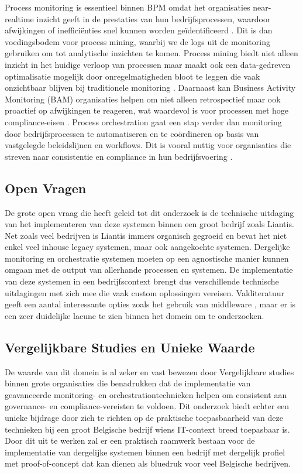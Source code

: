 Process monitoring is essentieel binnen BPM omdat het organisaties near-realtime inzicht geeft in de prestaties van hun bedrijfsprocessen, waardoor afwijkingen of inefficiënties snel kunnen worden geïdentificeerd \autocite{Janiesch2012}. Dit is dan voedingsbodem voor process mining, waarbij we de logs uit de monitoring gebruiken om tot analytische inzichten te komen. Process mining biedt niet alleen inzicht in het huidige verloop van processen maar maakt ook een data-gedreven optimalisatie mogelijk door onregelmatigheden bloot te leggen die vaak onzichtbaar blijven bij traditionele monitoring \autocite{Aalst2016}. Daarnaast kan Business Activity Monitoring (BAM) organisaties helpen om niet alleen retrospectief maar ook proactief op afwijkingen te reageren, wat waardevol is voor processen met hoge compliance-eisen \autocite{Janiesch2012}. Process orchestration gaat een stap verder dan monitoring door bedrijfsprocessen te automatiseren en te coördineren op basis van vastgelegde beleidslijnen en workflows. Dit is vooral nuttig voor organisaties die streven naar consistentie en compliance in hun bedrijfsvoering \autocite{Weske2019}. 

\subsection{Open Vragen}

De grote open vraag die heeft geleid tot dit onderzoek is de technische uitdaging van het implementeren van deze systemen binnen een groot bedrijf zoals Liantis. Net zoals veel bedrijven is Liantis immers organisch gegroeid en bevat het niet enkel veel inhouse legacy systemen, maar ook aangekochte systemen. Dergelijke monitoring en orchestratie systemen moeten op een agnostische manier kunnen omgaan met de output van allerhande processen en systemen. De implementatie van deze systemen in een bedrijfscontext brengt dus verschillende technische uitdagingen met zich mee die vaak custom oplossingen vereisen. Vakliteratuur geeft een aantal interessante opties zoals het gebruik van middleware \autocite{Weber2018}, maar er is een zeer duidelijke lacune te zien binnen het domein om te onderzoeken. 

\subsection{Vergelijkbare Studies en Unieke Waarde}

De waarde van dit domein is al zeker en vast bewezen door Vergelijkbare studies binnen grote organisaties \autocite{Harmon2014} die benadrukken dat de implementatie van geavanceerde monitoring- en orchestrationtechnieken helpen om consistent aan governance- en compliance-vereisten te voldoen. Dit onderzoek biedt echter een unieke bijdrage door zich te richten op de praktische toepasbaarheid van deze technieken bij een groot Belgische bedrijf wiens IT-context breed toepasbaar is. Door dit uit te werken zal er een praktisch raamwerk bestaan voor de implementatie van dergelijke systemen binnen een bedrijf met dergelijk profiel met proof-of-concept dat kan dienen als bluedruk voor veel Belgische bedrijven. 

